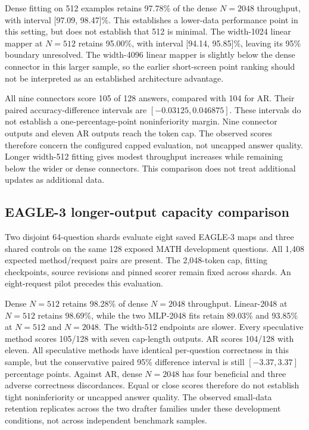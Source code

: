 \documentclass{article}
\begin{document}
Dense fitting on 512 examples retains 97.78\% of the dense $N=2048$
throughput, with interval [97.09, 98.47]\%. This establishes a lower-data
performance point in this setting, but does not establish that 512 is
minimal. The width-1024 linear mapper at $N=512$ retains 95.00\%, with
interval [94.14, 95.85]\%, leaving its 95\% boundary unresolved.
The width-4096 linear mapper is slightly below the dense connector in
this larger sample, so the earlier short-screen point ranking should
not be interpreted as an established architecture advantage.

All nine connectors score 105 of 128 answers, compared with 104 for AR.
Their paired accuracy-difference intervals are $[-0.03125,0.046875]$.
These intervals do not establish a one-percentage-point noninferiority
margin. Nine connector outputs and eleven AR outputs reach the token cap.
The observed scores therefore concern the configured capped evaluation,
not uncapped answer quality. Longer width-512 fitting gives modest
throughput increases while remaining below the wider or dense connectors.
This comparison does not treat additional updates as additional data.

\subsection{EAGLE-3 longer-output capacity comparison}
\label{app:eagle-quality}

Two disjoint 64-question shards evaluate eight saved EAGLE-3 maps and
three shared controls on the same 128 exposed MATH development questions.
All 1,408 expected method/request pairs are present. The 2,048-token cap,
fitting checkpoints, source revisions and pinned scorer remain fixed
across shards. An eight-request pilot precedes this evaluation.

\begin{table}[H]
\caption{EAGLE-3 with an 8B target on 128 exposed development questions.
Dense retention uses the $N=2048$ endpoint. Intervals are paired 95\%
request-bootstrap intervals conditional on the fits. Cap counts all
outputs reaching 2,048 tokens. It is not an exact truncation count.}
\label{tab:eagle-quality}
\centering\footnotesize
\setlength{\tabcolsep}{3pt}

\end{table}

Dense $N=512$ retains 98.28\% of dense $N=2048$ throughput. Linear-2048
at $N=512$ retains 98.69\%, while the two MLP-2048 fits retain 89.03\%
and 93.85\% at $N=512$ and $N=2048$. The width-512 endpoints are slower.
Every speculative method scores 105/128 with seven cap-length outputs.
AR scores 104/128 with eleven. All speculative methods have identical
per-question correctness in this sample, but the conservative paired
95\% difference interval is still $[-3.37,3.37]$ percentage points.
Against AR, dense $N=2048$ has four beneficial and three adverse
correctness discordances. Equal or close scores therefore do not
establish tight noninferiority or uncapped answer quality. The observed
small-data retention replicates across the two drafter families under
these development conditions, not across independent benchmark samples.
\end{document}
